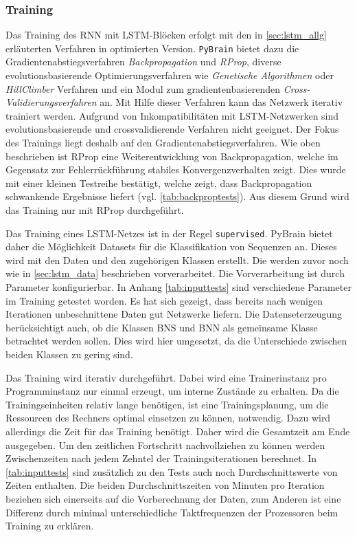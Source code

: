 \subsubsection{Training}
\label{sec:lstm_training}
Das Training des \ac{RNN} mit \ac{LSTM}-Blöcken erfolgt mit den in
\autoref{sec:lstm_allg} erläuterten Verfahren in optimierten Version.
\texttt{PyBrain} bietet dazu die Gradientenabstiegsverfahren
\textit{Backpropagation} und \textit{\ac{RProp}}, diverse evolutionsbasierende
Optimierungsverfahren wie \textit{Genetische Algorithmen} oder
\textit{HillClimber} Verfahren und ein Modul zum gradientenbasierenden
\textit{Cross-Validierungsverfahren} an. Mit Hilfe dieser Verfahren kann das
Netzwerk iterativ trainiert werden. Aufgrund von Inkompatibilitäten mit
\ac{LSTM}-Netzwerken sind evolutionsbasierende und crossvalidierende Verfahren
nicht geeignet. Der Fokus des Trainings liegt deshalb auf den
Gradientenabstiegsverfahren. Wie oben beschrieben ist \ac{RProp} eine
Weiterentwicklung von Backpropagation, welche im Gegensatz zur Fehlerrückführung
stabiles Konvergenzverhalten zeigt. Dies wurde mit einer kleinen Testreihe
bestätigt, welche zeigt, dass Backpropagation schwankende Ergebnisse liefert
(vgl. \autoref{tab:backproptests}). Aus diesem Grund wird das Training nur mit
\ac{RProp} durchgeführt.
 
Das Training eines \ac{LSTM}-Netzes ist in der Regel \texttt{supervised}.
PyBrain bietet daher die Möglichkeit Datasets für die Klassifikation von
Sequenzen an. Dieses wird mit den Daten und den zugehörigen Klassen erstellt.
Die werden zuvor noch wie in \autoref{sec:lstm_data} beschrieben vorverarbeitet.
Die Vorverarbeitung ist durch Parameter konfigurierbar. In Anhang
\autoref{tab:inputtests} sind verschiedene Parameter im Training getestet
worden. Es hat sich gezeigt, dass bereits nach wenigen Iterationen unbeschnittene
Daten gut Netzwerke liefern. Die Datenseterzeugung berücksichtigt auch, ob die
Klassen \ac{BNS} und \ac{BNN} als gemeinsame Klasse betrachtet werden sollen.
Dies wird hier umgesetzt, da die Unterschiede zwischen beiden Klassen zu gering
sind. 

Das Training wird iterativ durchgeführt. Dabei wird eine Trainerinstanz pro
Programminstanz nur einmal erzeugt, um interne Zustände zu erhalten. Da die
Trainingseinheiten relativ lange benötigen, ist eine Trainingsplanung, um die
Ressourcen des Rechners optimal einsetzen zu können, notwendig. Dazu wird
allerdings die Zeit für das Training benötigt. Daher wird die Gesamtzeit am Ende
ausgegeben. Um den zeitlichen Fortschritt nachvollziehen zu können werden
Zwischenzeiten nach jedem Zehntel der Trainingsiterationen berechnet. In
\autoref{tab:inputtests} sind zusätzlich zu den Tests auch noch
Durchschnittswerte von Zeiten enthalten. Die beiden Durchschnittszeiten von
Minuten pro Iteration beziehen sich einerseits auf die Vorberechnung der Daten,
zum Anderen ist eine Differenz durch minimal unterschiedliche Taktfrequenzen der
Prozessoren beim Training zu erklären.

